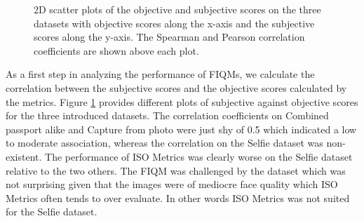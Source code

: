 \begin{figure}[h]
    \caption{2D scatter plots of the objective and subjective scores on the three datasets with objective scores along the x-axis and the subjective scores along the y-axis. The Spearman and Pearson correlation coefficients are shown above each plot.}
    \label{fig:corrISOsvsSub}
\end{figure}
\noindent 
As a first step in analyzing the performance of FIQMs, we calculate the correlation between the subjective scores and the objective scores calculated by the metrics. Figure \ref{fig:corrISOsvsSub} provides different plots of subjective against objective scores for the three introduced datasets. The correlation coefficients on Combined passport alike and Capture from photo were just shy of 0.5 which indicated a low to moderate association, whereas the correlation on the Selfie dataset was non-existent. The performance of ISO Metrics was clearly worse on the Selfie dataset relative to the two others. The FIQM was challenged by the dataset which was not surprising given that the images were of mediocre face quality which ISO Metrics often tends to over evaluate. In other words ISO Metrics was not suited for the Selfie dataset.  

